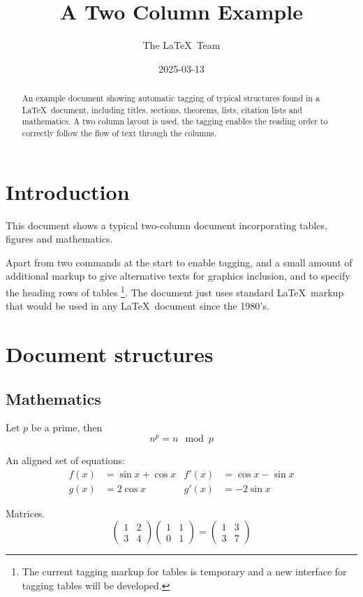 \documentclass[a4paper,twocolumn]{article}
\begin{document}
\title{A Two Column Example}
\date{2025-03-13}
\author{The \LaTeX\ Team}

\pagestyle{headings}

\maketitle

\begin{abstract}
  An example document showing automatic tagging of typical structures
  found in a \LaTeX\ document, including titles, sections, theorems, lists,
  citation lists and mathematics. A two column layout is used, the
  tagging enables the reading order to correctly follow the flow of
  text through the columns.
\end{abstract}

\tableofcontents

\section{Introduction}

This document shows a typical two-column document incorporating tables, figures and mathematics.

Apart from two commands at the start to enable tagging, and a small
amount of additional markup to give alternative texts for graphics
inclusion, and to specify the heading rows of tables%
\footnote{The current tagging markup for tables is temporary and a new interface
for tagging tables will be developed.}. The document
just uses standard \LaTeX\ markup that would be used in any \LaTeX\
document since the 1980's.

\section{Document structures}

\subsection{Mathematics}

Let $p$ be a prime, then
\[n^p=n \mod p\]

An aligned set of equations:
\begin{align}
  f(x)&=\sin x + \cos x  & f'(x) &=\cos x - \sin x \\
  g(x)&=2\cos x          & g'(x) &= -2\sin x
\end{align}

Matrices.
\[
\begin{pmatrix}1&2\\3&4\end{pmatrix}
\begin{pmatrix}1&1\\0&1\end{pmatrix}
=
\begin{pmatrix}1&3\\3&7\end{pmatrix}
\]
\end{document}
